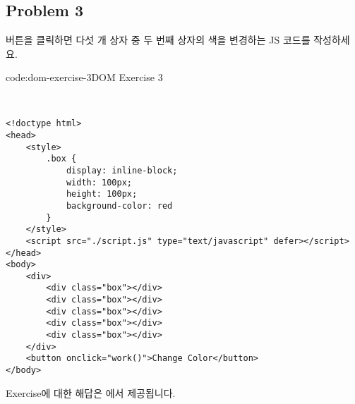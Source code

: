 \subsection*{Problem 3}

버튼을 클릭하면 다섯 개 상자 중 두 번째 상자의 색을 변경하는 JS 코드를 작성하세요.

\begin{codeenv}{code:dom-exercise-3}{DOM Exercise 3}\begin{verbatim}


<!doctype html>
<head>
    <style>
        .box { 
            display: inline-block; 
            width: 100px; 
            height: 100px; 
            background-color: red 
        }
    </style>
    <script src="./script.js" type="text/javascript" defer></script>
</head>
<body>
    <div>
        <div class="box"></div>
        <div class="box"></div>
        <div class="box"></div>
        <div class="box"></div>
        <div class="box"></div>
    </div>
    <button onclick="work()">Change Color</button>
</body>
\end{verbatim}
\end{codeenv}

Exercise에 대한 해답은 에서 제공됩니다. 
